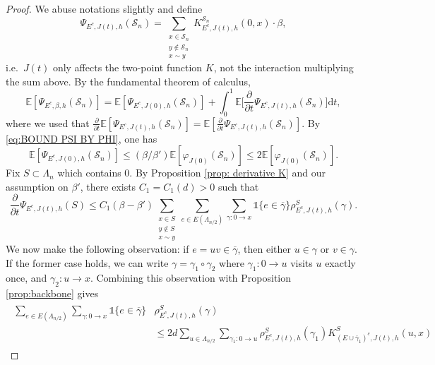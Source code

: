 \documentclass[11pt,a4paper]{article}
\numberwithin{equation}{section}
\theoremstyle{plain}
\theoremstyle{definition}
\begin{document}
\begin{proof} We abuse notations slightly and define
\begin{equation}
\Psi_{E^c,J(t),h}(\mathcal S_n)=\sum_{\substack{x\in \mathcal S_n\\y\notin \mathcal S_n\\x\sim y}}K_{E^c,J(t),h}^{\mathcal S_n}(0,x)\cdot \beta,
\end{equation}
i.e.~$J(t)$ only affects the two-point function $K$, not the interaction multiplying the sum above.
By the fundamental theorem of calculus, 
\begin{equation}\label{eq:pf der psi 1}
	\mathbb E[\Psi_{E^c,\beta,h}(\mathcal S_n)]=\mathbb E[\Psi_{E^c,J(0),h}(\mathcal S_n)]+\int_0^1\mathbb E\Big[\frac{\partial}{\partial t}\Psi_{E^c,J(t),h}(\mathcal S_n)\Big]\mathrm{d}t,
\end{equation}
where we used that $\frac{\partial}{\partial t}\mathbb E[\Psi_{E^c,J(t),h}(\mathcal S_n)]=\mathbb E[\frac{\partial}{\partial t}\Psi_{E^c,J(t),h}(\mathcal S_n)]$.
By \eqref{eq:BOUND PSI BY PHI}, one has
\begin{equation}\label{eq:pf der psi 2}
	\mathbb E[\Psi_{E^c,J(0),h}(\mathcal S_n)]\leq (\beta/\beta')\mathbb E[\varphi_{J(0)}(\mathcal S_n)]\leq 2\mathbb E[\varphi_{J(0)}(\mathcal S_n)].
\end{equation}
Fix $S\subset \Lambda_n$ which contains $0$. By Proposition \ref{prop: derivative K} and our assumption on $\beta'$, there exists $C_1=C_1(d)>0$ such that
\begin{equation}\label{eq:pf der psi 3}
	\frac{\partial}{\partial t}\Psi_{E^c,J(t),h}(S)\leq C_1(\beta-\beta')\sum_{\substack{x\in S\\y\notin  S\\ x\sim y}}\sum_{e\in E(\Lambda_{n/2})}\sum_{\gamma:0\rightarrow x}\mathds{1}\{e\in \overline{\gamma}\}\rho_{E^c,J(t),h}^{S}(\gamma).
\end{equation}
We now make the following observation: if $e=uv\in \overline{\gamma}$, then either $u\in \gamma$ or $v\in \gamma$. If the former case holds, we can write $\gamma=\gamma_1\circ\gamma_2$ where $\gamma_1:0\rightarrow u$ visits $u$ exactly once, and $\gamma_2: u\rightarrow x$. Combining this observation with Proposition \ref{prop:backbone} gives
\begin{align}\label{eq:pf der psi 4}
\begin{aligned}
	\sum_{e\in E(\Lambda_{n/2})}\sum_{\gamma:0\rightarrow x}\mathds{1}\{e\in \overline{\gamma}\}&\rho_{E^c,J(t),h}^{S}(\gamma)
	\\&\leq 2d \sum_{u\in \Lambda_{n/2}}\sum_{\gamma_1:0\rightarrow u}\rho_{E^c,J(t),h}^S(\gamma_1)K_{(E\cup\overline{\gamma}_1)^c,J(t),h}^S(u,x)

\end{aligned}
\end{align}
\end{proof}
\end{document}
